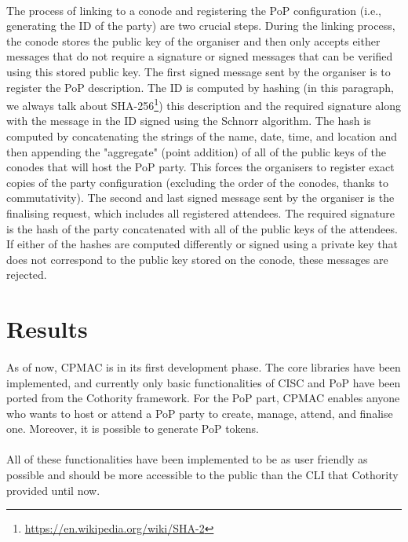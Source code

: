 \paragraph{}
The process of linking to a conode and registering the PoP configuration (i.e., generating the ID of the party) are two crucial steps. During the linking process, the conode stores the public key of the organiser and then only accepts either messages that do not require a signature or signed messages that can be verified using this stored public key. The first signed message sent by the organiser is to register the PoP description. The ID is computed by hashing (in this paragraph, we always talk about SHA-256\footnote{\url{https://en.wikipedia.org/wiki/SHA-2}}) this description and the required signature along with the message in the ID signed using the Schnorr algorithm. The hash is computed by concatenating the strings of the name, date, time, and location and then appending the "aggregate" (point addition) of all of the public keys of the conodes that will host the PoP party. This forces the organisers to register exact copies of the party configuration (excluding the order of the conodes, thanks to commutativity). The second and last signed message sent by the organiser is the finalising request, which includes all registered attendees. The required signature is the hash of the party concatenated with all of the public keys of the attendees. If either of the hashes are computed differently or signed using a private key that does not correspond to the public key stored on the conode, these messages are rejected.

\section{Results}

\paragraph{}
As of now, CPMAC is in its first development phase. The core libraries have been implemented, and currently only basic functionalities of CISC and PoP have been ported from the Cothority framework. For the PoP part, CPMAC enables anyone who wants to host or attend a PoP party to create, manage, attend, and finalise one. Moreover, it is possible to generate PoP tokens.

\paragraph{}
All of these functionalities have been implemented to be as user friendly as possible and should be more accessible to the public than the CLI that Cothority provided until now.

